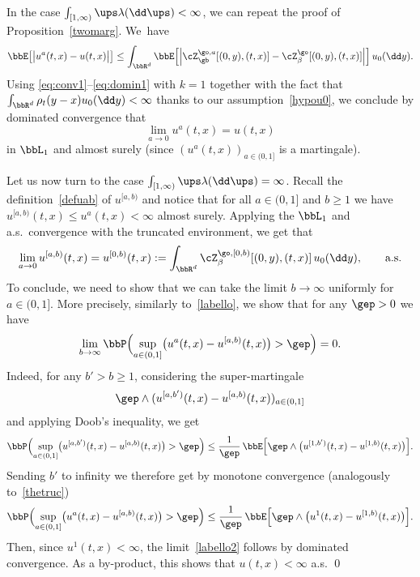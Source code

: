 In the case $\int_{[1,\infty)} \ups \lambda(\dd \ups) <\infty$,
we can repeat the proof of Proposition~\ref{twomarg}.
We~have
\begin{equation*}
\bbE\bigl[ \big| u^{a}(t,x) -u(t,x) \big| \bigr]
\le \int_{\bbR^d} \bbE \Bigl[ \Big| \cZ^{\go,a}_{\gb}[(0,y),(t,x)]
- \cZ^{\go}_{\beta}[(0,y),(t,x)] \Big|\Bigr] \, u_0 (\dd y).
\end{equation*}
Using \eqref{eq:conv1}--\eqref{eq:domin1} with $k=1$
together with the fact that $\int_{\bbR^d} \rho_t(y-x) u_0(\dd y) <\infty$ thanks to our assumption~\eqref{hypou0},
we conclude by dominated convergence that
\[
\lim_{a\to 0} u^{a}(t,x)
= u(t,x)
\]
in $\bbL_1$ and almost surely (since $(u^a(t,x))_{a\in(0,1]}$ is a martingale).

Let us now turn to the case $\int_{[1,\infty)} \ups \lambda(\dd \ups) = \infty$.
Recall the definition~\eqref{defuab} of $u^{[a,b)}$ and
notice that for all $a\in(0,1]$ and $b\ge 1$ we have $u^{[a,b)}(t,x) \leq u^{a}(t,x) <\infty$
almost surely.
Applying the $\bbL_1$ and a.s.\ convergence
with the truncated environment,
we get that
\begin{equation}
\lim_{a\to 0} u^{[a,b)}(t,x) = u^{[0,b)} (t,x) :=
\int_{\bbR^d}
\cZ^{\go,[0,b)}_{\beta}[(0,y),(t,x)] \, u_0(\dd y), \qquad \text{a.s.}
\end{equation}
To conclude, we need to show that we can take the limit
$b\to\infty$ uniformly for $a\in (0,1]$.
More precisely, similarly to~\eqref{labello}, we show that
for any $\gep>0$ we have
\begin{equation}
\label{labello2}
\lim_{b\to\infty} \bbP\Bigl(\sup_{a\in (0,1]} \bigl(u^{a}(t,x) - u^{[a,b)}(t,x) \bigr) >\gep \Bigr) =0.
\end{equation}
Indeed, for any $b'>b\geq 1$, considering the super-martingale
\[
\gep \wedge (u^{[a,b')}(t,x) - u^{[a,b)}(t,x))_{a\in(0,1]}
\]
and applying Doob's inequality, we get
\[
\bbP\Bigl(\sup_{a\in (0,1]} \bigl(u^{[a,b')}(t,x) - u^{[a,b)}(t,x) \bigr) >\gep \Bigr) \leq \frac1\gep\, \bbE\Bigl[ \gep \wedge \bigl(u^{[1,b')}(t,x) - u^{[1,b)}(t,x) \bigr) \Bigr].
\]
Sending $b'$ to infinity
we therefore get by monotone convergence (analogously to~\eqref{thetruc})
\[
\bbP\Bigl(\sup_{a\in (0,1]} \bigl(u^{a}(t,x) - u^{[a,b)}(t,x) \bigr) >\gep \Bigr) \leq \frac1\gep\, \bbE\Bigl[ \gep \wedge \bigl(u^{1}(t,x) - u^{[1,b)}(t,x) \bigr) \Bigr].
\]
Then, since $u^{1}(t,x)<\infty$,
the limit~\eqref{labello2} follows by dominated convergence.
As a by-product, this shows that $u(t,x)<\infty$ a.s.
\qed


